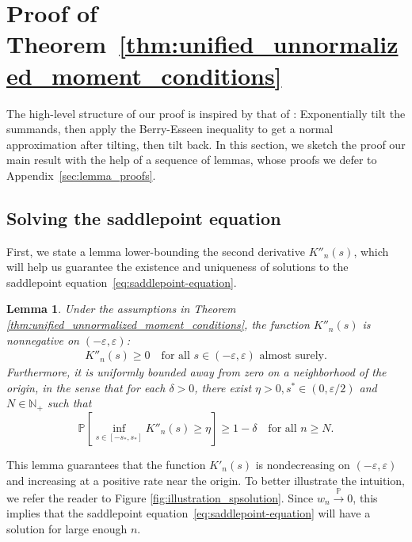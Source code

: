 \documentclass[12pt]{article}
\newtheorem{lemma}{Lemma}
\theoremstyle{definition}
\def\P{\mathbb{P}}
\def\P{\mathbb{P}}
\renewcommand{\P}{\mathbb{P}}							%
\newcommand{\convp}{\overset{\mathbb{P}}{\rightarrow}}             %
\begin{document}
\section{Proof of Theorem~\ref{thm:unified_unnormalized_moment_conditions}} \label{sec:spa_proof}

The high-level structure of our proof is inspired by that of \citet{Robinson1982}: Exponentially tilt the summands, then apply the Berry-Esseen inequality to get a normal approximation after tilting, then tilt back. In this section, we sketch the proof our main result with the help of a sequence of lemmas, whose proofs we defer to Appendix~\ref{sec:lemma_proofs}. 

\subsection{Solving the saddlepoint equation}\label{sec:solution_spa}

First, we state a lemma lower-bounding the second derivative $K''_n(s)$, which will help us guarantee the existence and uniqueness of solutions to the saddlepoint equation~\eqref{eq:saddlepoint-equation}.
\begin{lemma} \label{lem:positive_second_derivative}
Under the assumptions in Theorem \ref{thm:unified_unnormalized_moment_conditions}, the function $K''_n(s)$ is nonnegative on $(-\varepsilon, \varepsilon)$:
\begin{align}
K''_n(s) \geq 0 \quad \text{for all } s \in (-\varepsilon, \varepsilon) \text{ almost surely}. \label{eq:positive_second_derivative}
\end{align}
Furthermore, it is uniformly bounded away from zero on a neighborhood of the origin, in the sense that for each $\delta > 0$, there exist $\eta > 0, s^* \in (0, \varepsilon/2)$ and $N \in \mathbb N_+$ such that 
\begin{equation}
\P\left[\inf_{s \in [-s_*, s_*]} K''_n(s) \geq \eta\right] \geq 1-\delta \quad \text{for all } n \geq N. \label{eq:uniform_lower_bound_second_derivative}
\end{equation}
\end{lemma}
\noindent This lemma guarantees that the function $K'_n(s)$ is nondecreasing on $(-\varepsilon, \varepsilon)$ and increasing at a positive rate near the origin. To better illustrate the intuition, we refer the reader to Figure \ref{fig:illustration_spsolution}. Since $w_n \convp 0$, this implies that the saddlepoint equation~\eqref{eq:saddlepoint-equation} will have a solution for large enough $n$. 
\end{document}
